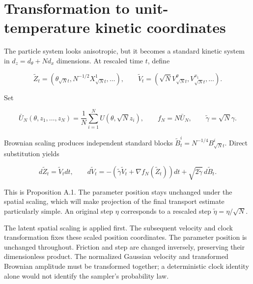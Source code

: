 \documentclass[11pt,a4paper]{article}
\begin{document}
\section{\texorpdfstring{Transformation to unit-temperature kinetic coordinates}{Transformation to unit-temperature kinetic coordinates}}


The particle system looks anisotropic, but it becomes a standard kinetic
system in \(d_z=d_\theta+Nd_x\) dimensions. At rescaled time \(t\), define


\[\widetilde Z_t=(\theta_{\sqrt Nt},N^{-1/2}X^1_{\sqrt Nt},\ldots),
\qquad\widetilde V_t=(\sqrt N V^\theta_{\sqrt Nt},V^{x_1}_{\sqrt Nt},\ldots).\]


Set


\[\bar U_N(\theta,z_1,\ldots,z_N)=\frac1N\sum_{i=1}^NU(\theta,\sqrt N z_i),
\qquad f_N=N\bar U_N,\qquad\widetilde\gamma=\sqrt N\gamma.\]


Brownian scaling produces independent standard blocks
\(\widetilde B_t^i=N^{-1/4}B^i_{\sqrt Nt}\). Direct substitution yields


\[d\widetilde Z_t=\widetilde V_tdt,\qquad
d\widetilde V_t=-(\widetilde\gamma\widetilde V_t+\nabla f_N(\widetilde Z_t))dt
+\sqrt{2\widetilde\gamma}\,d\widetilde B_t.\]


This is Proposition A.1. The parameter position stays unchanged under the
spatial scaling, which will make projection of the final transport estimate
particularly simple. An original step \(\eta\) corresponds to a rescaled
step \(\widetilde\eta=\eta/\sqrt N\).



The latent spatial scaling is applied first. The subsequent velocity and clock transformation fixes these scaled position coordinates. The parameter position is unchanged throughout. Friction and step are changed inversely, preserving their dimensionless product. The normalized Gaussian velocity and transformed Brownian amplitude must be transformed together; a deterministic clock identity alone would not identify the sampler’s probability law.
\end{document}
